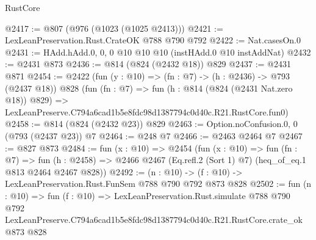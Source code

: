 \begin{lexlean}{RustCore}
\begin{coremodule}
@2417 := @807 (@976 (@1023 (@1025 @2413)))
@2421 := LexLeanPreservation.Rust.CrateOK @788 @790 @792
@2422 := Nat.casesOn.{0}
@2431 := HAdd.hAdd.{0, 0, 0} @10 @10 @10 (instHAdd.{0} @10 instAddNat)
@2432 := @2431 @873
@2436 := @814 (@824 (@2432 @18)) @829
@2437 := @2431 @871
@2454 := @2422
    (fun (y : @10) => (fn : @7) -> (h : @2436) -> @793 (@2437 @18))
    @828
    (fun (fn : @7) =>
    fun (h : @814 (@824 (@2431 Nat.zero @18)) @829) =>
    LexLeanPreserve.C794a6cad1b5e8fdc98d1387794c0d40c.R21.RustCore.fun0)
@2458 := @814 (@824 (@2432 @23)) @829
@2463 := Option.noConfusion.{0, 0} (@793 (@2437 @23)) @7
@2464 := @248 @7
@2466 := @2463 @2464 @7
@2467 := @827 @873
@2484 := fun (x : @10) =>
  @2454
    (fun (x : @10) =>
    fun (fn : @7) =>
    fun (h : @2458) => @2466 @2467 (Eq.refl.{2} (Sort 1) @7) (heq_of_eq.{1} @813 @2464 @2467 @828))
@2492 := (n : @10) -> (f : @10) -> LexLeanPreservation.Rust.FunSem @788 @790 @792 @873 @828
@2502 := fun (n : @10) =>
  fun (f : @10) =>
  LexLeanPreservation.Rust.simulate
    @788
    @790
    @792
    LexLeanPreserve.C794a6cad1b5e8fdc98d1387794c0d40c.R21.RustCore.crate_ok
    @873
    @828
\end{coremodule}
\end{lexlean}
